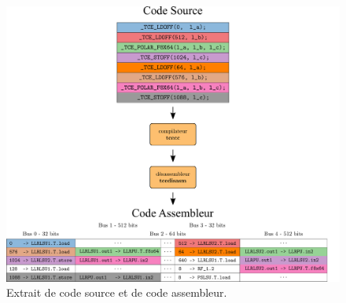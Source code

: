 \begin{figure}[t]
\centering
\includegraphics[width=\textwidth]{main/ch4_fig/ilp_1}
\caption{Extrait de code source et de code assembleur.}
\label{fig:ilp_1}
\end{figure}


